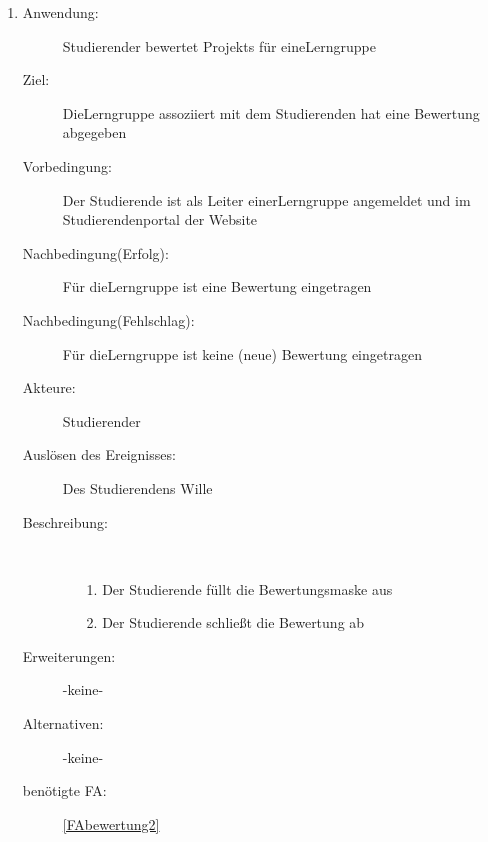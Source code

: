 \documentclass[parskip=full]{scrartcl}
\newcommand{\swtLabel}[1]{\textbf{/#1\arabic*0/}}
\begin{document}
\begin{enumerate}[label=\swtLabel{S}]
  
  \item
  \begin{description}
  \item[Anwendung:] Studierender bewertet \glspl{Projekt} für eine\gls{Lerngruppe}
  \item[Ziel:] Die\gls{Lerngruppe} assoziiert mit dem Studierenden hat eine Bewertung
  abgegeben
  	\item[Vorbedingung:] Der Studierende ist als Leiter einer\gls{Lerngruppe} angemeldet
  	und im Studierendenportal der Website
  	\item[Nachbedingung(Erfolg):] Für die\gls{Lerngruppe} ist eine Bewertung eingetragen
  	\item[Nachbedingung(Fehlschlag):] Für die\gls{Lerngruppe} ist keine (neue)
  	Bewertung eingetragen
  	\item[Akteure:] Studierender
  	\item[Auslösen des Ereignisses:] Des Studierendens Wille
  	\item[Beschreibung:]~
  	 \begin{enumerate}
  	   \item[1.] Der Studierende füllt die Bewertungsmaske aus
  	   \item[2.] Der Studierende schließt die Bewertung ab
  	 \end{enumerate}
  	\item[Erweiterungen:] -keine-
  	\item[Alternativen:] -keine-
  	\item[benötigte FA:] \ref{FAbewertung2}
  \end{description}
   

\end{enumerate}
\end{document}
